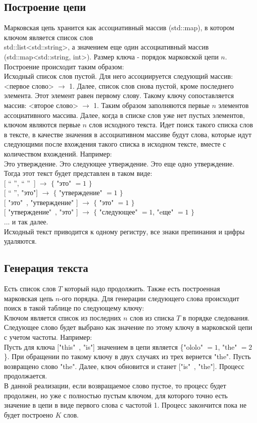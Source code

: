 \documentclass[a4paper]{article}
\begin{document}
\subsection{Построение цепи}
Марковская цепь хранится как ассоциативный массив (std::map), в котором ключом является список слов\\ std::list<std::string>, а значением еще один ассоциативный массив (std::map<std::string, int>).
Размер ключа  - порядок марковской цепи $n$.\\
Построение происходит таким образом:\\
Исходный  список слов пустой. Для него ассоциируется следующий массив: <первое слово> $\rightarrow$ 1.
Далее, список слов снова пустой, кроме последнего элемента. Этот элемент равен первому слову. Такому ключу сопоставляется массив: <второе слово> $\rightarrow$ 1. Таким образом заполняются первые $n$ элементов ассоциативного массива. Далее, когда в  списке слов уже нет пустых элементов, ключом являются первые $n$ слов исходного текста.
Идет поиск такого списка слов в тексте, в качестве значения в ассоциативном массиве будут слова, которые идут следующими после вхождения такого списка в исходном тексте, вместе с количеством вхождений.
Например:\\
\indent Это утверждение. Это следующее утверждение. Это еще одно утверждение.\\
Тогда этот текст будет представлен в таком виде:\\
$[$ `` '',  `` ''\ $]$ $\rightarrow$ $\{$ "это" $= 1$ $\}$\\
$[$ `` '', "это"$]$ $\rightarrow$ $\{$ "утверждение" $= 1$ $\}$\\
$[$ "это"\ , "утверждение" $]$ $\rightarrow$ $\{$ "это" $= 1$ $\}$\\
$[$ "утверждение"\ ,  "это" $]$ $\rightarrow$ $\{$ "следующее" $= 1$, "eще" $=1$ $\}$\\
...
и так далее.\\
Исходный текст приводится к одному регистру, все знаки препинания и цифры удаляются.
\subsection{Генерация текста}
Есть список слов $T$ который надо продолжить. Также есть построенная марковская цепь $n$-ого порядка. Для генерации следующего слова происходит поиск в такой таблице по следующему ключу:\\
Ключом является список из последних $n$ слов из списка $T$ в порядке следования. Следующее слово будет выбрано как значение по этому ключу в марковской цепи с учетом частоты. Например:\\
Пусть для ключа ["this"\ , "is"] значением в цепи является \{"ololo" $= 1$, "the" $= 2$\}. При обращении по такому ключу в двух случаях из трех вернется "the". Пусть возвращено слово "the". Далее, ключ обновится и станет ["is"\ , "the"]. Процесс продолжается. \\
В данной реализации, если возвращаемое слово пустое, то процесс будет продолжен, но уже с полностью пустым ключом, для которого точно есть значение в цепи в виде первого слова с частотой 1. Процесс закончится пока не будет построено $K$ слов.
\end{document}
